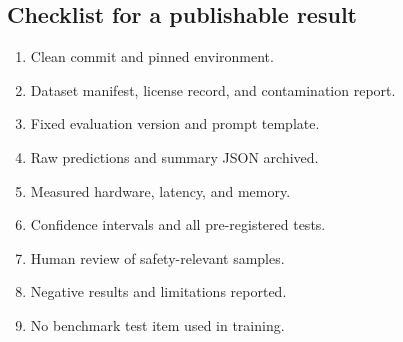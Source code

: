\subsection{Checklist for a publishable result}

\begin{enumerate}[leftmargin=1.4em]
  \item Clean commit and pinned environment.
  \item Dataset manifest, license record, and contamination report.
  \item Fixed evaluation version and prompt template.
  \item Raw predictions and summary JSON archived.
  \item Measured hardware, latency, and memory.
  \item Confidence intervals and all pre-registered tests.
  \item Human review of safety-relevant samples.
  \item Negative results and limitations reported.
  \item No benchmark test item used in training.
\end{enumerate}
